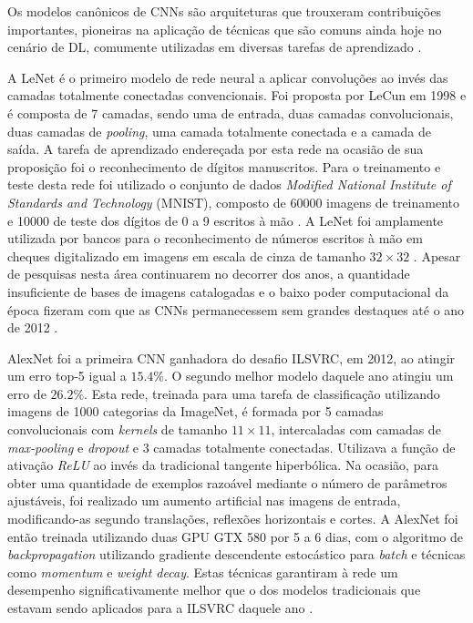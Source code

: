 
Os modelos canônicos de CNNs são arquiteturas que trouxeram contribuições importantes, pioneiras na aplicação de técnicas que são comuns ainda hoje no cenário de DL, comumente utilizadas em diversas tarefas de aprendizado \cite{9dlpapers}.

A LeNet é o primeiro modelo de rede neural a aplicar convoluções ao invés das camadas totalmente conectadas convencionais. Foi proposta por LeCun em 1998 e é composta de 7 camadas, sendo uma de entrada, duas camadas convolucionais, duas camadas de \emph{pooling}, uma camada totalmente conectada e a camada de saída. A tarefa de aprendizado endereçada por esta rede na ocasião de sua proposição foi o reconhecimento de dígitos manuscritos. Para o treinamento e teste desta rede foi utilizado o conjunto de dados \emph{Modified National Institute of Standards and Technology} (MNIST), composto de 60000 imagens de treinamento e 10000 de teste dos dígitos de 0 a 9 escritos à mão \cite{mnist}. A LeNet foi amplamente utilizada por bancos para o reconhecimento de números escritos à mão em cheques digitalizado em imagens em escala de cinza de tamanho $32 \times 32$ \cite{lenet}. Apesar de pesquisas nesta área continuarem no decorrer dos anos, a quantidade insuficiente de bases de imagens catalogadas e o baixo poder computacional da época fizeram com que as CNNs permanecessem sem grandes destaques até o ano de 2012 \cite{9dlpapers}.

AlexNet foi a primeira CNN ganhadora do desafio ILSVRC, em 2012, ao atingir um erro top-5 igual a $15.4\%$. O segundo melhor modelo daquele ano atingiu um erro de $26.2\%$. Esta rede, treinada para uma tarefa de classificação utilizando imagens de 1000 categorias da ImageNet, é formada por 5 camadas convolucionais com \emph{kernels} de tamanho $11 \times 11$, intercaladas com camadas de \emph{max-pooling} e \emph{dropout} e $3$ camadas totalmente conectadas. Utilizava a função de ativação \emph{ReLU} ao invés da tradicional tangente hiperbólica. Na ocasião, para obter uma quantidade de exemplos razoável mediante o número de parâmetros ajustáveis, foi realizado um aumento artificial nas imagens de entrada, modificando-as segundo translações, reflexões horizontais e cortes. A AlexNet foi então treinada utilizando duas GPU GTX 580 por 5 a 6 dias, com o algoritmo de \emph{backpropagation} utilizando gradiente descendente estocástico para \emph{batch} e técnicas como \emph{momentum} e \emph{weight decay}. Estas técnicas garantiram à rede um desempenho significativamente melhor que o dos modelos tradicionais que estavam sendo aplicados para a ILSVRC daquele ano \cite{alexnet}.

